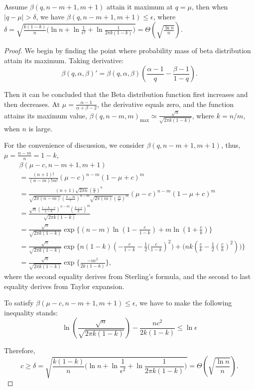 \begin{lemma}\label{lem:1}
    Assume $\beta(q,n-m+1,m+1)$ attain it maximum at $q=\mu$, then when $\mid q-\mu\mid > \delta$, we have $\beta(q,n-m+1,m+1)\le \epsilon$, where $\delta = \sqrt{\frac{k(1-k)}{n}\big(\ln n+\ln \frac{1}{\epsilon^2}+\ln \frac{1}{2\pi k(1-k)}\big)}=\Theta(\sqrt{\frac{\ln n}{n}})$.
\end{lemma}
\begin{proof}
    We begin by finding the point where probability mass of beta distribution attain its maximum. Taking derivative: 
$$\beta(q,\alpha,\beta)'=\beta(q,\alpha,\beta)(\frac{\alpha-1}{q}-\frac{\beta-1}{1-q}).$$

    Then it can be concluded that the Beta distribution function first increases and then decreases. At \(\mu = \frac{\alpha - 1}{\alpha + \beta - 2}\), the derivative equals zero, and the function attains its maximum value, $\beta(q,n-m,m)_{\max}\simeq\frac{\sqrt{n}}{\sqrt{2\pi k(1-k)}}$, where $k=n/m$, when $n$ is large.

For the convenience of discussion, we consider $\beta(q,n-m+1,m+1)$, thus, $\mu=\frac{n-m}{n}=1-k$, 
$$
\begin{aligned}
&\beta(\mu-c,n-m+1,m+1) \\&=\frac{(n+1)!}{(n-m)!m!}(\mu-c)^{n-m}(1-\mu+c)^{m} \\&=\frac{(n+1)\sqrt{2\pi n}(\frac{n}{e})^n}{\sqrt{2\pi (n-m)}(\frac{n-m}{e})^{n-m}\sqrt{2\pi (m)}(\frac{m}{e})^{m}}(\mu-c)^{n-m}(1-\mu+c)^{m}\\&=\frac{\sqrt{n}(\frac{1-k-c}{1-k})^{n-m}(\frac{k+c}{k})^m}{\sqrt{2\pi k(1-k)}} \\&=\frac{\sqrt{n}}{\sqrt{2\pi k(1-k)}}\exp\{(n-m)\ln (1-\frac{c}{1-k})+m\ln (1+\frac{c}{k})\} \\&=\frac{\sqrt{n}}{\sqrt{2\pi k(1-k)}}\exp\{n(1-k)(-\frac{c}{1-k}-\frac{1}{2}\big(\frac{c}{1-k})^2\big) + \big( nk (\frac{c}{k}-\frac{1}{2}(\frac{c}{k})^2)\big) \}\\&=\frac{\sqrt{n}}{\sqrt{2\pi k(1-k)}}\exp\{ \frac{-nc^2}{2k(1-k)}\},   
\end{aligned}
$$
where the second equality derives from Sterling's formula, and the second to last equality derives from Taylor expansion.

To satisfy $\beta(\mu-c,n-m+1,m+1)\le \epsilon$, we have to make the following inequality stands:
$$\ln (\frac{\sqrt{n}}{\sqrt{2\pi k(1-k)}})-\frac{nc^2}{2k(1-k)}\le \ln \epsilon$$

Therefore, 
$$c\ge \delta=\sqrt{\frac{k(1-k)}{n}\big(\ln n+\ln \frac{1}{\epsilon^2}+\ln \frac{1}{2\pi k(1-k)}\big)}=\Theta(\sqrt{\frac{\ln n}{n}}).$$



\end{proof}
